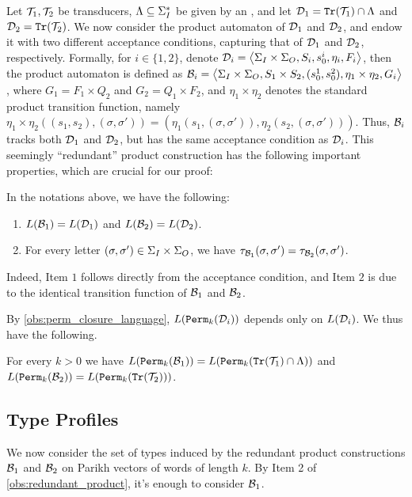 Let $\mathcal{T}_1,\mathcal{T}_2$ be transducers, $\Lambda\subseteq \Sigma_{I}^*$ be given by an \NFA, and let $\mathcal{D}_1={\mathtt{Tr}}(\mathcal{T}_1)\cap \Lambda$ and $\mathcal{D}_2={\mathtt{Tr}}(\mathcal{T}_2)$. 
We now consider the product automaton of $\mathcal{D}_1$ and $\mathcal{D}_2$, and endow it with two different acceptance conditions, capturing that of $\mathcal{D}_1$ and $\mathcal{D}_2$, respectively. Formally, for $i\in \{1,2\}$, denote $\mathcal{D}_i=\left< \Sigma_{I}\times\Sigma_{O},S_i,s^i_0,\eta_i,F_i\right>$, then the product automaton is defined as $\mathcal{B}_i=\left< \Sigma_{I}\times\Sigma_{O},S_1\times S_2,(s^1_0,s^2_0),\eta_1\times \eta_2,G_i\right>$, where $G_1=F_1\times Q_2$ and $G_2=Q_1\times F_2$, and $\eta_1\times \eta_2$ denotes the standard product transition function, namely $\eta_1\times\eta_2((s_1,s_2),(\sigma,\sigma'))=(\eta_1(s_1,(\sigma,\sigma')),\eta_2(s_2,(\sigma,\sigma')))$. Thus, $\mathcal{B}_i$ tracks both $\mathcal{D}_1$ and $\mathcal{D}_2$, but has the same acceptance condition as $\mathcal{D}_i$. This seemingly ``redundant'' product construction has the following important properties, which are crucial for our proof:
\begin{observation}
	\label{obs:redundant_product}
 In the notations above, we have the following:
	\begin{enumerate}
		\item $L(\mathcal{B}_1)=L(\mathcal{D}_1)$ and $L(\mathcal{B}_2)=L(\mathcal{D}_2)$.
		\item For every letter $(\sigma,\sigma')\in \Sigma_{I}\times\Sigma_{O}$, we have $\tau_{\mathcal{B}_1}(\sigma,\sigma')=\tau_{\mathcal{B}_2}(\sigma,\sigma')$.
	\end{enumerate}
	\end{observation}
	
Indeed, Item $1$ follows directly from the acceptance condition, and Item $2$ is due to the identical transition function of $\mathcal{B}_1$ and $\mathcal{B}_2$.

By \autoref{obs:perm_closure_language}, $L({\mathtt{Perm}}_k(\mathcal{D}_i))$ depends only on $L(\mathcal{D}_i)$. We thus have the following.
\begin{observation}
	\label{obs:redundant_product_for_perm_automata}
	 For every $k>0$
	  we have 
	 $L({\mathtt{Perm}}_k(\mathcal{B}_1))=L({\mathtt{Perm}}_k({\mathtt{Tr}}(\mathcal{T}_1)\cap \Lambda))$ and $L({\mathtt{Perm}}_k(\mathcal{B}_2))=L({\mathtt{Perm}}_k({\mathtt{Tr}}(\mathcal{T}_2)))$.
	\end{observation}

\subsection*{Type Profiles}
We now consider the set of types induced by the redundant product constructions $\mathcal{B}_1$ and $\mathcal{B}_2$ on Parikh vectors of words of length $k$. By Item 2 of \autoref{obs:redundant_product}, it's enough to consider $\mathcal{B}_1$. 

